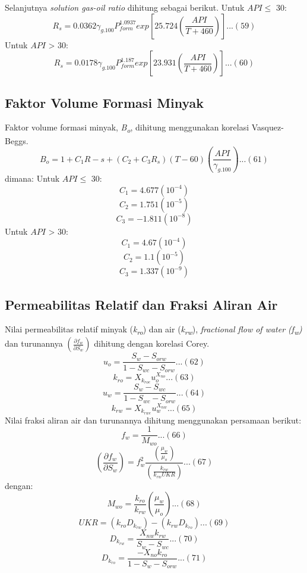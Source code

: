 \documentclass[
]{book}
\begin{document}
Selanjutnya \emph{solution gas-oil ratio} dihitung sebagai berikut.
Untuk \(API \leq\) 30:
\[R_s = 0.0362 \gamma_{g.100}P_{form}^{1.0937}exp \left[ 25.724 \left( \frac{API}{T+460} \right) \right]...(59)\]
Untuk \(API\) \textgreater{} 30:
\[R_s = 0.0178 \gamma_{g.100}P_{form}^{1.187}exp \left[ 23.931 \left( \frac{API}{T+460} \right) \right]...(60)\]

\hypertarget{faktor-volume-formasi-minyak-1}{%
\subsection{Faktor Volume Formasi Minyak}\label{faktor-volume-formasi-minyak-1}}

Faktor volume formasi minyak, \emph{B\textsubscript{o}}, dihitung menggunakan korelasi Vasquez-Beggs.
\[B_o = 1 + C_1R-s + (C_2 + C_3R_s)(T-60) \left( \frac{API}{\gamma_{g.100}} \right)...(61)\]
dimana:
Untuk \(API \leq\) 30:
\[C_1 = 4.677 (10^{-4})\]
\[C_2 = 1.751 (10^{-5})\]
\[C_3 = -1.811 (10^{-8})\]
Untuk \(API\) \textgreater{} 30:\\
\[C_1 = 4.67 (10^{-4})\]
\[C_2 = 1.1 (10^{-5})\]
\[C_3 = 1.337 (10^{-9})\]

\hypertarget{permeabilitas-relatif-dan-fraksi-aliran-air}{%
\subsection{Permeabilitas Relatif dan Fraksi Aliran Air}\label{permeabilitas-relatif-dan-fraksi-aliran-air}}

Nilai permeabilitas relatif minyak (\emph{k\textsubscript{ro}}) dan air (\emph{k\textsubscript{rw}}), \emph{fractional flow of water (f\textsubscript{w})} dan turunannya \(\left( \frac{\partial f_w}{\partial S_w} \right)\) dihitung dengan korelasi Corey.
\[u_o = \frac{S_{w}-S_{orw}}{1-S_{wc}-S_{orw}}...(62)\]
\[k_{ro}=X_{k_{roe}}u_o^{X_{no}}...(63)\]
\[u_w = \frac{S_{w}-S_{wc}}{1-S_{wc}-S_{orw}}...(64)\]
\[k_{rw}=X_{k_{rwe}}u_w^{X_{nw}}...(65)\]
Nilai fraksi aliran air dan turunannya dihitung menggunakan persamaan berikut:
\[f_w = \frac{1}{M_{wo}}...(66)\]
\[\left( \frac{\partial f_w}{\partial S_w} \right) = f_w^2 \frac{\left( \frac{\mu_w}{\mu_o} \right)}{\left( \frac{k_{rw}}{k_{rw}UKR} \right)}...(67)\]
dengan:
\[M_{wo} = \frac{k_{ro}}{k_{rw}}\left( \frac{\mu_w}{\mu_o} \right)...(68)\]
\[UKR = (k_{ro}D_{k_{rw}})-(k_{rw}D_{k_{ro}})...(69)\]
\[D_{k_{rw}}= \frac{X_{nw}{k_{rw}}}{S_w - S_{wc}}...(70)\]
\[D_{k_{ro}}= \frac{-X_{no}{k_{ro}}}{1-S_w - S_{orw}}...(71)\]
\end{document}
